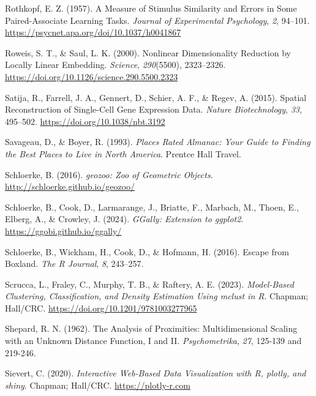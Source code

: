 \documentclass[
  letterpaper,
]{krantz}
\newlength{\cslhangindent}
\newenvironment{CSLReferences}[2] %
 {\begin{list}{}{%
  \setlength{\itemindent}{0pt}
  \setlength{\leftmargin}{0pt}
  \setlength{\parsep}{0pt}
  \ifodd #1
   \setlength{\leftmargin}{\cslhangindent}
   \setlength{\itemindent}{-1\cslhangindent}
  \fi
  \setlength{\itemsep}{#2\baselineskip}}}
 {\end{list}}
\begin{document}
\begin{CSLReferences}{1}{0}
Rothkopf, E. Z. (1957). A {M}easure of {S}timulus {S}imilarity and
{E}rrors in {S}ome {P}aired-{A}ssociate {L}earning {T}asks.
\emph{Journal of Experimental Psychology}, \emph{2}, 94--101.
\url{https://psycnet.apa.org/doi/10.1037/h0041867}

Roweis, S. T., \& Saul, L. K. (2000). Nonlinear {D}imensionality
{R}eduction by {L}ocally {L}inear {E}mbedding. \emph{Science},
\emph{290}(5500), 2323--2326.
\url{https://doi.org/10.1126/science.290.5500.2323}

Satija, R., Farrell, J. A., Gennert, D., Schier, A. F., \& Regev, A.
(2015). Spatial {R}econstruction of {S}ingle-{C}ell {G}ene {E}xpression
{D}ata. \emph{Nature Biotechnology}, \emph{33}, 495--502.
\url{https://doi.org/10.1038/nbt.3192}

Savageau, D., \& Boyer, R. (1993). \emph{Places {R}ated {A}lmanac:
{Y}our {G}uide to {F}inding the {B}est {P}laces to {L}ive in {N}orth
{A}merica}. Prentce Hall Travel.

Schloerke, B. (2016). \emph{{geozoo}: {Z}oo of {G}eometric {O}bjects}.
\url{http://schloerke.github.io/geozoo/}

Schloerke, B., Cook, D., Larmarange, J., Briatte, F., Marbach, M.,
Thoen, E., Elberg, A., \& Crowley, J. (2024). \emph{{GGally}:
{E}xtension to {ggplot2}}. \url{https://ggobi.github.io/ggally/}

Schloerke, B., Wickham, H., Cook, D., \& Hofmann, H. (2016). Escape from
{B}oxland. \emph{The R Journal}, \emph{8}, 243--257.

Scrucca, L., Fraley, C., Murphy, T. B., \& Raftery, A. E. (2023).
\emph{Model-{B}ased {C}lustering, {C}lassification, and {D}ensity
{E}stimation {U}sing {mclust} in {R}}. Chapman; Hall/CRC.
\url{https://doi.org/10.1201/9781003277965}

Shepard, R. N. (1962). The {A}nalysis of {P}roximities:
{M}ultidimensional {S}caling with an {U}nknown {D}istance {F}unction,
{I} and {II}. \emph{Psychometrika}, \emph{27}, 125-139 and 219-246.

Sievert, C. (2020). \emph{Interactive {W}eb-{B}ased {D}ata
{V}isualization with {R}, plotly, and shiny}. Chapman; Hall/CRC.
\url{https://plotly-r.com}


\end{CSLReferences}
\end{document}
